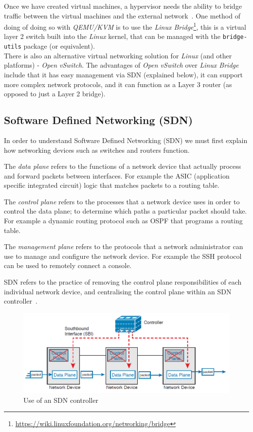 \documentclass[
    author={Jacob Daniel Halsey},
    supervisor={Prof. Awais Rashid},
    degree={BSc},
    title={Building a Testbed for Evaluating Privacy Enhancing Technologies  (PETs)},
    subtitle={},
    type={software development},
    year={2021}
]{dissertation}
\begin{document}
Once we have created virtual machines, a hypervisor needs the ability to bridge traffic between
the virtual machines and the external network~\cite{openvswitch_why}. 
One method of doing of doing so with \emph{QEMU/KVM} is to use the 
\emph{Linux Bridge}\footnote{\url{https://wiki.linuxfoundation.org/networking/bridge}},
this is a virtual layer 2 switch built into the \emph{Linux} kernel, that can be
managed with the \texttt{bridge-utils} package (or equivalent). \\

There is also an alternative virtual networking solution for \emph{Linux} (and other platforms)
- \emph{Open vSwitch}. The advantages of \emph{Open vSwitch} over \emph{Linux Bridge} include that it has
easy management via SDN (explained below), it can support more complex network protocols, and it can
function as a Layer 3 router (as opposed to just a Layer 2 bridge).

\subsection{Software Defined Networking (SDN)}

In order to understand Software Defined Networking (SDN) we must first explain how networking
devices such as switches and routers function. 

The \emph{data plane} refers to the functions of a network device that actually process and forward
packets between interfaces. For example the ASIC (application specific integrated circuit) logic
that matches packets to a routing table.

The \emph{control plane} refers to the processes that a network device uses in order to control
the data plane; to determine which paths a particular packet should take. For example a
dynamic routing protocol such as OSPF that programs a routing table.

The \emph{management plane} refers to the protocols that a network administrator can
use to manage and configure the network device. For example the SSH protocol can be used
to remotely connect a console.

SDN refers to the practice of removing the control plane responsibilities of each individual
network device, and centralising the control plane within an 
SDN controller~\cite[760]{odom_2016_ccna}.\\

\begin{figure}
	\centering
	\includegraphics[width=12cm]{img/sdn}
	\caption{Use of an SDN controller~\cite[767]{odom_2016_ccna}}
	\label{fig:sdn_diagram}
\end{figure}
\end{document}
